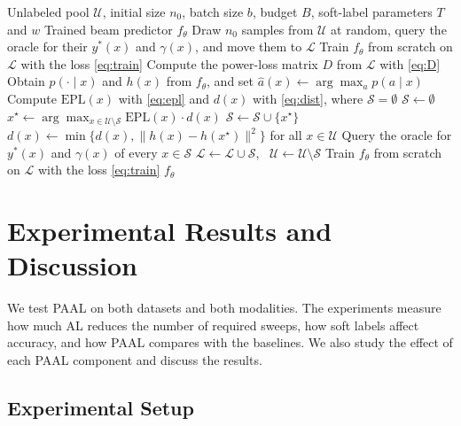 \documentclass[journal,onecolumn]{IEEEtran}
\begin{document}
\begin{algorithm}[!t]
  \caption{Power-Aware Active Learning (PAAL)}
  \label{alg:paal}
  \begin{algorithmic}[1]
    \Require Unlabeled pool $\mathcal{U}$, initial size $n_0$, batch size $b$, budget $B$, soft-label parameters $T$ and $w$
    \Ensure Trained beam predictor $f_\theta$
    \State Draw $n_0$ samples from $\mathcal{U}$ at random, query the oracle for their $y^{*}(x)$ and $\gamma(x)$, and move them to $\mathcal{L}$
    \State Train $f_\theta$ from scratch on $\mathcal{L}$ with the loss \eqref{eq:train}
    \State Compute the power-loss matrix $D$ from $\mathcal{L}$ with \eqref{eq:D}
    \State Obtain $p(\cdot \mid x)$ and $h(x)$ from $f_\theta$, and set $\hat a(x) \gets \arg\max_a p(a \mid x)$
    \State Compute $\mathrm{EPL}(x)$ with \eqref{eq:epl} and $d(x)$ with \eqref{eq:dist}, where $\mathcal{S} = \emptyset$
    \EndFor
    \State $\mathcal{S} \gets \emptyset$
    \State $x^{\star} \gets \arg\max_{x \in \mathcal{U} \setminus \mathcal{S}} \mathrm{EPL}(x) \cdot d(x)$
    \State $\mathcal{S} \gets \mathcal{S} \cup \{x^{\star}\}$
    \State $d(x) \gets \min\big\{d(x), \|h(x) - h(x^{\star})\|^{2}\big\}$ for all $x \in \mathcal{U}$
    \EndWhile
    \State Query the oracle for $y^{*}(x)$ and $\gamma(x)$ of every $x \in \mathcal{S}$
    \State $\mathcal{L} \gets \mathcal{L} \cup \mathcal{S}$, \ $\mathcal{U} \gets \mathcal{U} \setminus \mathcal{S}$
    \State Train $f_\theta$ from scratch on $\mathcal{L}$ with the loss \eqref{eq:train}
    \EndWhile
    \State \Return $f_\theta$
  \end{algorithmic}
\end{algorithm}

\section{Experimental Results and Discussion}
\label{sec:eval}

We test PAAL on both datasets and both modalities. The experiments measure how much AL reduces the number of required sweeps, how soft labels affect accuracy, and how PAAL compares with the baselines. We also study the effect of each PAAL component and discuss the results.

\subsection{Experimental Setup}
\end{document}
